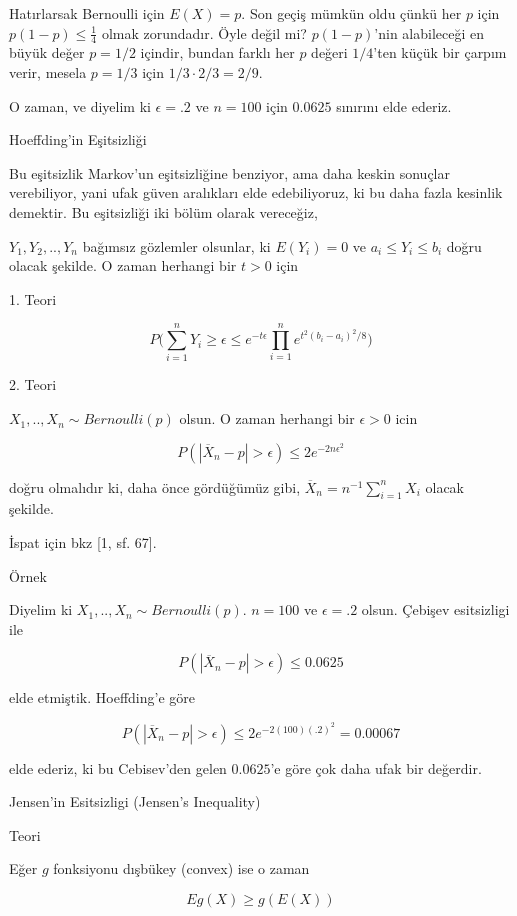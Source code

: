 \documentclass[12pt,fleqn]{article}\usepackage{../../common}
\begin{document}
Hatırlarsak Bernoulli için $E(X)=p$. Son geçiş mümkün oldu çünkü her $p$
için $p(1-p) \le \frac{1}{4}$ olmak zorundadır. Öyle değil mi? $p(1-p)$'nin
alabileceği en büyük değer $p=1/2$ içindir, bundan farklı her $p$ değeri
$1/4$'ten küçük bir çarpım verir, mesela $p=1/3$ için
$1/3 \cdot 2/3 = 2/9$.

O zaman, ve diyelim ki $\epsilon = .2$ ve $n=100$ için $0.0625$ sınırını
elde ederiz. 

Hoeffding'in Eşitsizliği

Bu eşitsizlik Markov'un eşitsizliğine benziyor, ama daha keskin sonuçlar
verebiliyor, yani ufak güven aralıkları elde edebiliyoruz, ki bu daha fazla
kesinlik demektir. Bu eşitsizliği iki bölüm olarak vereceğiz, 

$Y_1,Y_2,..,Y_n$ bağımsız gözlemler olsunlar, ki $E(Y_i)=0$ ve
$a_i \le Y_i \le b_i$ doğru olacak şekilde. O zaman herhangi bir $t>0$ için 

1. Teori

$$ 
P \bigg( 
\sum_{i=1}^{n} Y_i \ge \epsilon \le e^{-t\epsilon} 
\prod_{i=1}^{n} e^{{t^2}(b_i-a_i)^2 / 8}
\bigg)
$$

2. Teori

$X_1,..,X_n \sim Bernoulli(p)$ olsun. O zaman herhangi bir $\epsilon > 0$ icin

$$ P(|\overline{X}_n -p| > \epsilon ) \le 2e^{-2n\epsilon^2}$$

doğru olmalıdır ki, daha önce gördüğümüz gibi,
$\overline{X}_n = n^{-1}\sum_{i=1}^{n} X_i$ olacak şekilde. 

İspat için bkz [1, sf. 67]. 

Örnek

Diyelim ki $X_1,..,X_n \sim Bernoulli(p)$. $n=100$ ve $\epsilon=.2$
olsun. Çebişev esitsizligi ile 

$$ P(|\overline{X}_n - p| > \epsilon ) \le 0.0625 $$

elde etmiştik. Hoeffding'e göre

$$ 
P(|\overline{X}_n - p| > \epsilon ) \le 2e^{-2 (100)(.2)^2} = 0.00067
$$

elde ederiz, ki bu Cebisev'den gelen $0.0625$'e göre çok daha ufak bir
değerdir.


Jensen'in Esitsizligi (Jensen's Inequality)

Teori

Eğer $g$ fonksiyonu dışbükey (convex) ise o zaman

$$
E g(X) \ge g(E(X)) 
$$
\end{document}
